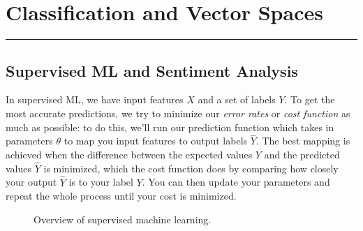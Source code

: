 \documentclass[12pt]{article}
\begin{document}
\renewcommand{\d}[1]{\ensuremath{\operatorname{d}\!{#1}}}

\tableofcontents
\newpage
\section{Classification and Vector Spaces}\vspace{.1pt} \hrule height 2pt \smallskip \renewcommand{\arraystretch}{1}%
\subsection{Supervised ML and Sentiment Analysis}
In supervised ML, we have input features $X$ and a set of labels $Y$. To get the most accurate predictions, we try to minimize our \emph{error rates} or \emph{cost function} as much as possible: to do this, we'll run our prediction function which takes in parameters $\theta$ to map you input features to output labels $\hat Y$. The best mapping is achieved when the difference between the expected values $Y$ and the predicted values $\hat Y$ is minimized, which the cost function does by comparing how closely your output $\hat Y$ is to your label $Y$. You can then update your parameters and repeat the whole process until your cost is minimized.

\begin{figure}[h]
\begin{center}
\end{center}
\label{fig: supervised_ml}
\caption{Overview of supervised machine learning.}
\end{figure}
\end{document}
